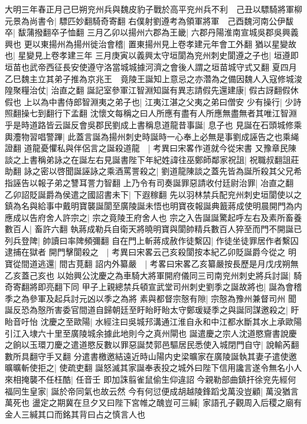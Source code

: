 大明三年春正月己巳朔兖州兵與魏皮豹子戰於高平兖州兵不利　己丑以驃騎將軍柳元景為尚書令|{
	驃匹妙翻騎奇寄翻}
右僕射劉遵考為領軍將軍　己酉魏河南公伊馛卒|{
	馛蒲撥翻卒子恤翻}
三月乙卯以揚州六郡為王畿|{
	六郡丹陽淮南宣城吳郡吳興義興也}
更以東揚州為揚州徙治會稽|{
	置東揚州見上卷孝建元年會工外翻}
猶以星變故也|{
	星變見上卷孝建三年}
三月庚寅以義興太守垣閬為兖州刺史閬遵之子也|{
	垣遵即垣苗也武帝西征長安使遵守洛當城城據河濟之會後人謂之垣苗城守式又翻}
夏四月乙巳魏主立其弟子推為京兆王　竟陵王誕知上意忌之亦濳為之備因魏人入寇修城浚隍聚糧治仗|{
	治直之翻}
誕記室參軍江智淵知誕有異志請假先還建康|{
	假古訝翻假休假也}
上以為中書侍郎智淵夷之弟子也|{
	江夷江湛之父夷之弟曰僧安}
少有操行|{
	少詩照翻操七到翻行下孟翻}
沈懷文每稱之曰人所應有盡有人所應無盡無者其唯江智淵乎是時道路皆云誕反會吳郡民劉成上書稱息道龍昔事誕|{
	息子也}
見誕在石頭城修乘輿灋物習唱警蹕|{
	此蓋言誕為揚州刺史時誕時一心奉上必無是事劉成誣告之也乘䋲證翻}
道龍憂懼私與伴侶言之誕殺道龍　|{
	考異曰宋畧作道就今從宋書}
又豫章民陳談之上書稱弟詠之在誕左右見誕書陛下年紀姓諱往巫鄭師鄰家祝詛|{
	祝職叔翻詛莊助翻}
詠之密以啓聞誕誣詠之乘酒罵詈殺之|{
	劉道龍陳談之蓋先皆為誕所殺其父兄希指誣告以報子弟之讐耳詈力智翻}
上乃令有司奏誕罪惡請收付廷尉治罪|{
	冶直之翻}
乙卯詔貶誕爵為侯遣之國詔書未下|{
	下遐稼翻}
先以羽林禁兵配兖州刺史垣閬使以之鎮為名與給事中戴明寶襲誕閬至廣陵誕未悟也明寶夜報誕典籖蔣成使明晨開門為内應成以告府舍人許宗之|{
	宗之竟陵王府舍人也}
宗之入告誕誕驚起呼左右及素所畜養數百人|{
	畜許六翻}
執蔣成勒兵自衛天將曉明寶與閬帥精兵數百人猝至而門不開誕已列兵登陴|{
	帥讀曰率陴頻彌翻}
自在門上斬蔣成赦作徒繫囚|{
	作徒坐徒罪居作者繫囚逮捕在獄者}
開門擊閬殺之　|{
	考異曰宋畧云己亥殺閬按本紀乙卯貶誕爵今從之}
明寶從間道逃還|{
	間古莧翻}
詔内外纂嚴　|{
	考畧曰宋畧乙亥纂嚴按長歷是月戊戌朔無乙亥蓋己亥也}
以始興公沈慶之為車騎大將軍開府儀同三司南兖州刺史將兵討誕|{
	騎奇寄翻將即亮翻下同}
甲子上親總禁兵頓宣武堂司州刺史劉季之誕故將也|{
	誕為會稽季之為參軍及起兵討元凶以季之為將}
素與都督宗慤有隙|{
	宗慤為豫州兼督司州}
聞誕反恐為慤所害委官間道自歸朝廷至盱眙盱眙太守鄭瑗疑季之與誕同謀邀殺之|{
	盱眙音吁怡}
沈慶之至歐陽|{
	水經注曰吳城䢴溝通江淮自永和中江都水斷其水上承歐陽引江入埭六十里至廣陵城余據此地則今之真州閘也}
誕遣慶之宗人沈道愍齎書說慶之餉以玉環刀慶之遣道愍反數以罪惡誕焚郭邑驅居民悉使入城閉門自守|{
	說輸芮翻數所具翻守手又翻}
分遣書檄邀結遠近時山陽内史梁曠家在廣陵誕執其妻子遣使邀曠曠斬使拒之|{
	使疏吏翻}
誕怒滅其家誕奉表投之城外曰陛下信用讒言遂令無名小人來相掩襲不任枉酷|{
	任音壬}
即加誅翦雀鼠偷生仰違詔今親勒部曲鎮扞徐兖先經何福同生皇家|{
	誕於帝同氣也故云然}
今有何愆便成胡越陵鋒蹈戈萬没豈顧|{
	萬没猶言萬死也}
盪定之期冀在旦夕又曰陛下宮帷之醜豈可三緘|{
	家語孔子觀周入后稷之廟有金人三緘其口而銘其背曰占之慎言人也}
